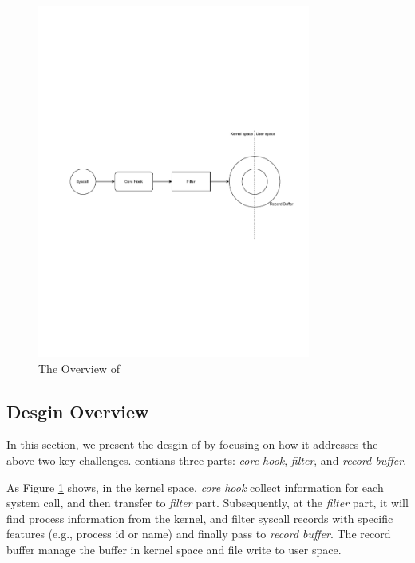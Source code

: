 \begin{figure}
    \centering
    \includegraphics[width=0.8\textwidth]{figures/arch.pdf}
    \caption{The Overview of \TheName}
    \label{fig:arch}
\end{figure}




\subsection{Desgin Overview}

In this section, we present the desgin of \TheName by focusing on how it addresses the above two key challenges. \TheName contians three parts: \textit{core hook}, \textit{filter}, and \textit{record buffer}. 

As Figure \ref{fig:arch} shows, in the kernel space, \textit{core hook} collect information for each system call, and then transfer to \textit{filter} part. Subsequently, at the \textit{filter} part, it will find process information from the kernel, and filter syscall records with specific features (e.g., process id or name) and finally pass to \textit{record buffer}. The record buffer manage the buffer in kernel space and file write to user space.


